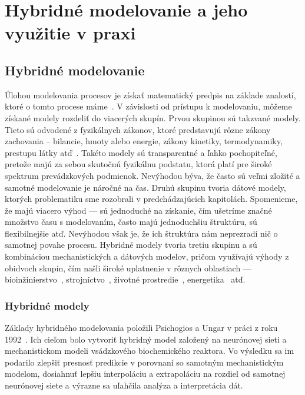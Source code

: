 \part{Hybridné modelovanie a jeho využitie v praxi}
\chapter{Hybridné modelovanie}
Úlohou modelovania procesov je získať matematický predpis na základe znalostí, ktoré o tomto procese máme~\cite{hangos:process_modelling:2001}. V závislosti od prístupu k modelovaniu, môžeme získané modely rozdeliť do viacerých skupín. Prvou skupinou sú takzvané  modely. Tieto sú odvodené z fyzikálnych zákonov, ktoré predstavujú rôzne zákony zachovania -- bilancie, hmoty alebo energie, zákony kinetiky, termodynamiky, prestupu látky atď~\cite{bangi:chem_engineer:2020}. Takéto modely sú transparentné a ľahko pochopiteľné, pretože majú za sebou skutočnú fyzikálnu podstatu, ktorá platí pre široké spektrum prevádzkových podmienok. Nevýhodou býva, že často sú veľmi zložité a samotné modelovanie je náročné na čas. Druhú skupinu tvoria dátové modely, ktorých problematiku sme rozobrali v predchádzajúcich kapitolách. Spomenieme, že majú viacero výhod --- sú jednoduché na získanie, čím ušetríme značné množstvo času s modelovaním, často majú jednoduchšiu štruktúru, sú flexibilnejšie atď. Nevýhodou však je, že ich štruktúra nám neprezradí nič o samotnej povahe procesu. Hybridné modely tvoria tretiu skupinu a sú kombináciou mechanistických a dátových modelov, pričom využívajú výhody z obidvoch skupín, čím našli široké uplatnenie v rôznych oblastiach --- bioinžinierstvo~\cite{srivastava:hybrid_biomolecules:2020}, strojníctvo~\cite{liu:hybrid_vehicle:2020}, životné prostredie~\cite{liu:hybrid_waste_water:2019}, energetika~\cite{qian:hybrid_energy:2019} atď.

\section{Hybridné modely}
Základy hybridného modelovania položili Psichogios a Ungar v práci  z roku 1992~\cite{psichogios:hybrid_process_model:1992}. Ich cieľom bolo vytvoriť hybridný model založený na neurónovej sieti a mechanistickom modeli vsádzkového biochemického reaktora. Vo výsledku sa im podarilo zlepšiť presnosť predikcie v porovnaní so samotným mechanistickým modelom, dosiahnuť lepšiu interpoláciu a extrapoláciu na rozdiel od samotnej neurónovej siete a výrazne sa uľahčila analýza a interpretácia dát.

